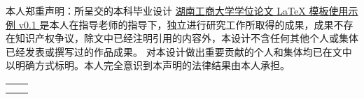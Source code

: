 
\begin{declarationzh}
		
本人郑重声明：所呈交的本科毕业设计 \uline{ 湖南工商大学学位论文 \LaTeX{} 模板使用示例 v0.1 } 是本人在指导老师的指导下，独立进行研究工作所取得的成果，成果不存在知识产权争议，除文中已经注明引用的内容外，本设计不含任何其他个人或集体已经发表或撰写过的作品成果。
对本设计做出重要贡献的个人和集体均已在文中以明确方式标明。本人完全意识到本声明的法律结果由本人承担。
	
	\vspace{30pt}
	\begin{tabular}{ll}
		\hspace{240pt} \makebox[4em][s]{作者签名：熊雅轩} & \underline{\makebox[100pt][c]{  }} \\
		\hspace{240pt} \makebox[4em][s]{日\qquad 期:}	 &
		\underline{\makebox[100pt][c]{\qquad2024年\quad12月\quad29日 }} \\
	\end{tabular}

	
	
\end{declarationzh}